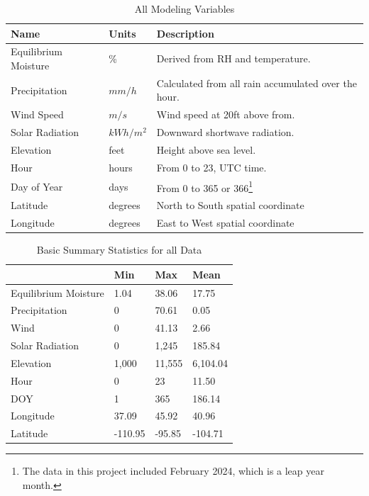 \documentclass[11pt]{article}%
\begin{document}
\begin{table}[ht]
\centering
\caption{All Modeling Variables}
\label{tab:all_vars}
\begin{tabular}{|l|l|l|}
\hline
\textbf{Name}           & \textbf{Units} & \textbf{Description} \\  \hline
Equilibrium Moisture    & \%             & Derived from RH and temperature.    \\ \hline
Precipitation           & $mm/h$         & Calculated from all rain accumulated over the hour. \\ \hline
Wind Speed              & $m/s$          & Wind speed at 20ft above from.  \\ \hline
Solar Radiation         & $kWh/m^2$      & Downward shortwave radiation.   \\ \hline
Elevation               & feet           & Height above sea level.\\ 
\hline
Hour                    & hours          & From 0 to 23, UTC time.    \\ 
\hline
Day of Year             & days           & From 0 to 365 or 366\footnote{The data in this project included February 2024, which is a leap year month.}   \\ 
\hline
Latitude                & degrees        &  North to South spatial coordinate    \\ 
\hline
Longitude               & degrees        &  East to West spatial coordinate    \\ 
\hline

\end{tabular}
\end{table}

\begin{table}[ht]
\centering
\caption{Basic Summary Statistics for all Data}
\label{tab:all_dat_summary}
\begin{tabular}{llll}
\toprule
 & Min & Max & Mean \\
\midrule
Equilibrium Moisture & 1.04 & 38.06 & 17.75 \\
Precipitation & 0 & 70.61 & 0.05 \\
Wind & 0 & 41.13 & 2.66 \\
Solar Radiation & 0 & 1,245 & 185.84 \\
Elevation & 1,000 & 11,555 & 6,104.04 \\
Hour & 0 & 23 & 11.50 \\
DOY & 1 & 365 & 186.14 \\
Longitude & 37.09 & 45.92 & 40.96 \\
Latitude & -110.95 & -95.85 & -104.71 \\
\bottomrule
\end{tabular}
\end{table}
\end{document}

